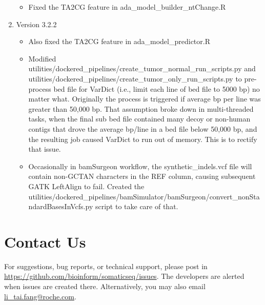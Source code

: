\documentclass[10pt,letterpaper]{article}
\begin{document}
\begin{sloppypar}
\begin{enumerate}
		\begin{itemize}
		
			\item Fixed the TA2CG feature in ada\_model\_builder\_ntChange.R
		
		\end{itemize}


	\item Version 3.2.2
	
		\begin{itemize}
		
			\item Also fixed the TA2CG feature in ada\_model\_predictor.R
			
			\item Modified utilities/dockered\_pipelines/create\_tumor\_normal\_run\_scripts.py and utilities/dockered\_pipelines/create\_tumor\_only\_run\_scripts.py to pre-process bed file for VarDict (i.e., limit each line of bed file to 5000 bp) no matter what. Originally the process is triggered if average bp per line was greater than 50,000 bp. That assumption broke down in multi-threaded tasks, when the final sub bed file contained many decoy or non-human contigs that drove the average bp/line in a bed file below 50,000 bp, and the resulting job caused VarDict to run out of memory. This is to rectify that issue.
			
            \item Occasionally in bamSurgeon workflow, the synthetic\_indels.vcf file will contain non-GCTAN characters in the REF column, causing subsequent GATK LeftAlign to fail. Created the utilities/dockered\_pipelines/bamSimulator/bamSurgeon/convert\_nonStandardBasesInVcfs.py script to take care of that. 
		
		\end{itemize}


\end{enumerate}




\section{Contact Us}
For suggestions, bug reports, or technical support, please post in \href{https://github.com/bioinform/somaticseq/issues}{https://github.com/bioinform/somaticseq/issues}. The developers are alerted when issues are created there. Alternatively, you may also email \href{mailto:li_tai.fang@roche.com}{li\_tai.fang@roche.com}. 












\end{sloppypar}
\end{document}

